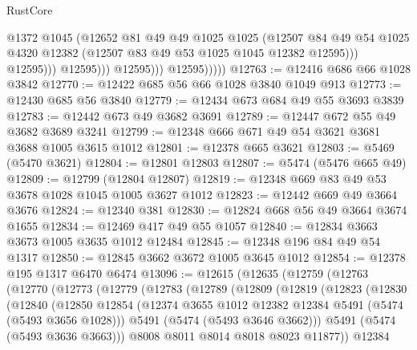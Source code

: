 \begin{lexlean}{RustCore}
\begin{coremodule}
                                @1372
                                @1045
                                (@12652
                                  @81
                                  @49
                                  @49
                                  @1025
                                  @1025
                                  (@12507
                                    @84
                                    @49
                                    @54
                                    @1025
                                    @4320
                                    @12382
                                    (@12507 @83 @49 @53 @1025 @1045 @12382 @12595)))
                                @12595)))
                          @12595)))
                    @12595)))
              @12595)))))
@12763 := @12416 @686 @66 @1028 @3842
@12770 := @12422 @685 @56 @66 @1028 @3840 @1049 @913
@12773 := @12430 @685 @56 @3840
@12779 := @12434 @673 @684 @49 @55 @3693 @3839
@12783 := @12442 @673 @49 @3682 @3691
@12789 := @12447 @672 @55 @49 @3682 @3689 @3241
@12799 := @12348 @666 @671 @49 @54 @3621 @3681 @3688 @1005 @3615 @1012
@12801 := @12378 @665 @3621
@12803 := @5469 (@5470 @3621)
@12804 := @12801 @12803
@12807 := @5474 (@5476 @665 @49)
@12809 := @12799 (@12804 @12807)
@12819 := @12348 @669 @83 @49 @53 @3678 @1028 @1045 @1005 @3627 @1012
@12823 := @12442 @669 @49 @3664 @3676
@12824 := @12340 @381
@12830 := @12824 @668 @56 @49 @3664 @3674 @1655
@12834 := @12469 @417 @49 @55 @1057
@12840 := @12834 @3663 @3673 @1005 @3635 @1012 @12484
@12845 := @12348 @196 @84 @49 @54 @1317
@12850 := @12845 @3662 @3672 @1005 @3645 @1012
@12854 := @12378 @195 @1317 @6470 @6474
@13096 := @12615
    (@12635
      (@12759
        (@12763
          (@12770
            (@12773
              (@12779
                (@12783
                  (@12789
                    (@12809
                      (@12819
                        (@12823
                          (@12830
                            (@12840
                              (@12850
                                @12854
                                (@12374 @3655 @1012 @12382 @12384 @5491 (@5474 (@5493 @3656 @1028)))
                                @5491
                                (@5474 (@5493 @3646 @3662)))
                              @5491
                              (@5474 (@5493 @3636 @3663)))
                            @8008
                            @8011
                            @8014
                            @8018
                            @8023
                            @11877))
                        @12384

\end{coremodule}
\end{lexlean}
